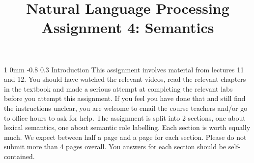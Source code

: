 \documentclass[11pt]{article}
\title{{\LARGE Natural Language Processing}\\[1.5mm]{\large Assignment 4: Semantics}}
\author{}
\date{} %
\makeatletter
\renewcommand{\section}{\@startsection
{section}%
{1}%
{0mm}%
{-0.8\baselineskip}%
{0.3\baselineskip}%
{\bfseries\large}}%
\makeatother
\begin{document}
 


\maketitle
\section{Introduction}
\noindent This assignment involves material from lectures 11 and
12. You should have watched the relevant videos, read the relevant
chapters in the textbook and made a serious attempt at completing the
relevant labs before you attempt this assignment.  If you feel you
have done that and still find the instructions unclear, you are
welcome to email the course teachers and/or go to office hours to ask
for help.  The assignment is split into 2 sections, one about lexical
semantics, one about semantic role labelling. Each section is worth
equally much. We expect between half a page and a page for each
section. Please do not submit more than 4 pages overall.  You answers
for each section should be self-contained.
\end{document}
